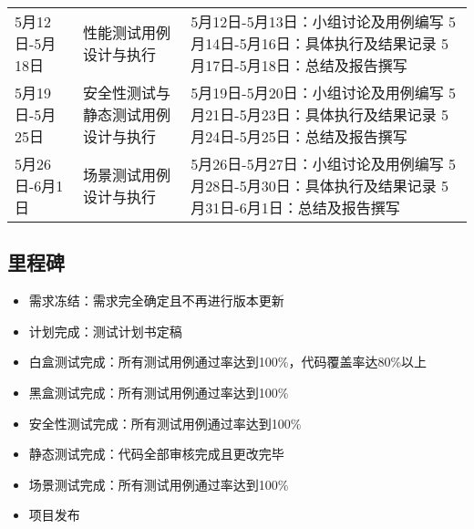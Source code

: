 \documentclass[hyperref, a4paper]{ctexart}
\providecommand{\tightlist}{%
  \setlength{\itemsep}{0pt}\setlength{\parskip}{0pt}}
\begin{document}
\begin{longtable}[]{@{}lll@{}}
\begin{minipage}[t]{0.13\columnwidth}\raggedright
5月12日-5月18日\strut
\end{minipage} & \begin{minipage}[t]{0.28\columnwidth}\raggedright
性能测试用例设计与执行\strut
\end{minipage} & \begin{minipage}[t]{0.50\columnwidth}\raggedright
5月12日-5月13日：小组讨论及用例编写 5月14日-5月16日：具体执行及结果记录
5月17日-5月18日：总结及报告撰写\strut
\end{minipage}\tabularnewline
\begin{minipage}[t]{0.13\columnwidth}\raggedright
5月19日-5月25日\strut
\end{minipage} & \begin{minipage}[t]{0.28\columnwidth}\raggedright
安全性测试与静态测试用例设计与执行\strut
\end{minipage} & \begin{minipage}[t]{0.50\columnwidth}\raggedright
5月19日-5月20日：小组讨论及用例编写 5月21日-5月23日：具体执行及结果记录
5月24日-5月25日：总结及报告撰写\strut
\end{minipage}\tabularnewline
\begin{minipage}[t]{0.13\columnwidth}\raggedright
5月26日-6月1日\strut
\end{minipage} & \begin{minipage}[t]{0.28\columnwidth}\raggedright
场景测试用例设计与执行\strut
\end{minipage} & \begin{minipage}[t]{0.50\columnwidth}\raggedright
5月26日-5月27日：小组讨论及用例编写 5月28日-5月30日：具体执行及结果记录
5月31日-6月1日：总结及报告撰写\strut
\end{minipage}\tabularnewline
\bottomrule
\end{longtable}

\hypertarget{ux91ccux7a0bux7891}{%
\subsection{里程碑}\label{ux91ccux7a0bux7891}}

\begin{itemize}
\tightlist
\item
  需求冻结：需求完全确定且不再进行版本更新
\item
  计划完成：测试计划书定稿
\item
  白盒测试完成：所有测试用例通过率达到100\%，代码覆盖率达80\%以上
\item
  黑盒测试完成：所有测试用例通过率达到100\%
\item
  安全性测试完成：所有测试用例通过率达到100\%
\item
  静态测试完成：代码全部审核完成且更改完毕
\item
  场景测试完成：所有测试用例通过率达到100\%
\item
  项目发布
\end{itemize}
\end{document}
